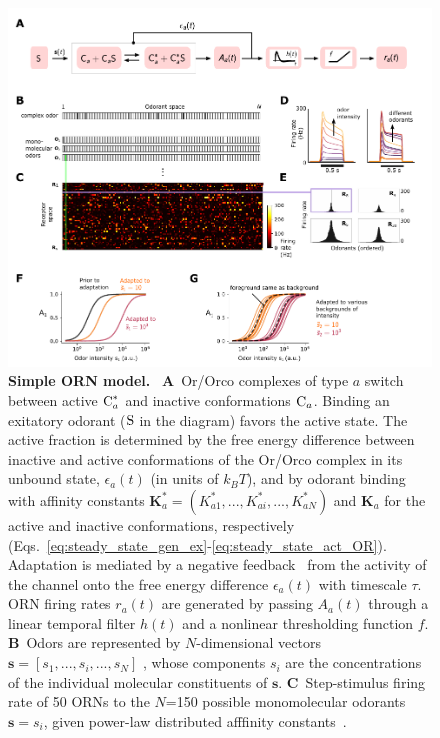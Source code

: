 \documentclass[9pt,lineno]{elife}
\begin{document}
\begin{figure}
	\begin{fullwidth}
		\includegraphics[width=0.95\linewidth]{figure1}
		\caption{\footnotesize{
			\textbf{Simple ORN model.}~\citep{srinivas_elife} \textbf{A}~Or/Orco complexes of type $a$ switch between active $\textup{C}^*_a$ and inactive conformations $\textup{C}_a$. Binding an exitatory odorant ($\textup{S}$ in the diagram) favors the active state. The active fraction is determined by the free energy difference between inactive and active conformations of the Or/Orco complex in its unbound state, $\epsilon_a(t)$ (in units of $k_B T$), and by odorant binding with affinity constants $\mathbf{K}^*_a=(K^*_{a1},...,K^*_{ai},...,K^*_{aN})$ and $\mathbf{K}_a$ for the active and inactive conformations, respectively (Eqs.~\ref{eq:steady_state_gen_ex}-\ref{eq:steady_state_act_OR}). Adaptation is mediated by a negative feedback~\citep{nagel_wilson_biophysical} from the activity of the channel onto the free energy difference $\epsilon_a(t)$ with timescale $\tau$. ORN firing rates $r_a(t)$ are generated by passing $A_a(t)$ through a linear temporal filter $h(t)$ and a nonlinear thresholding function $f$.
			\textbf{B}~Odors are represented by $N$-dimensional vectors $\mathbf{s}=[s_1,...,s_i,...,s_N]$ , whose components $s_i$ are the concentrations of  the individual molecular constituents  of $\mathbf s$. 
			\textbf{C}~Step-stimulus firing rate of 50 ORNs to the $N$=150 possible monomolecular odorants $\mathbf s = s_i$, given  power-law distributed afffinity constants~\citep{si2017invariances}.
}}
\end{fullwidth}
\end{figure}
\end{document}
